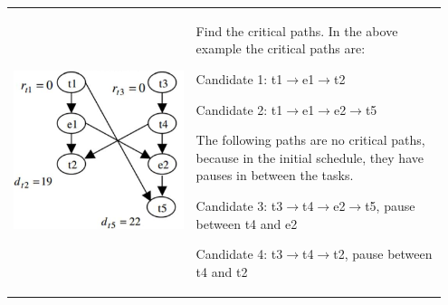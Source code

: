 		\begin{longtable}{p{0.4\linewidth}p{0.55\linewidth}}
			\vspace{0pt}
			
			\includegraphics[scale=0.75]{./pictures/voltage_scheduling_bindings.png}
			&
				\begin{compactenum}
					\item Find the critical paths. In the above example the critical paths are:
					\begin{compactitem}
						\item Candidate 1: t1$\rightarrow$e1$\rightarrow$t2
						\item Candidate 2: t1$\rightarrow$e1$\rightarrow$e2$\rightarrow$t5
					\end{compactitem}
					The following paths are no critical paths, because in the initial schedule, they have pauses in between the tasks. 
					\begin{compactitem}
						\item Candidate 3: t3$\rightarrow$t4$\rightarrow$e2$\rightarrow$t5, pause between t4 and e2
						\item Candidate 4: t3$\rightarrow$t4$\rightarrow$t2, pause between t4 and t2
					\end{compactitem} 
				\end{compactenum}\\[-\normalbaselineskip]
			

\end{longtable}
